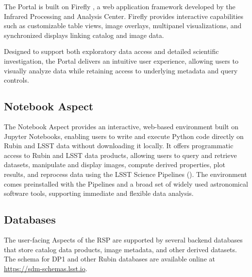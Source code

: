 The Portal is built on \gls{Firefly} \citep[][]{2019ASPC..521...32W}, a  web application framework developed by the Infrared Processing and Analysis Center.
\gls{Firefly} provides interactive capabilities such as customizable table views, image overlays, multipanel visualizations, and synchronized displays linking catalog and image data.

Designed to support both exploratory data access and detailed scientific investigation, the Portal delivers an intuitive user experience, allowing users to visually analyze data while retaining access to underlying metadata and query controls.

\subsection{Notebook Aspect}
\label{subsec:notebook}
The Notebook Aspect provides an interactive, web-based environment built on Jupyter Notebooks, enabling users to write and execute Python code directly on Rubin and \gls{LSST} data without downloading it locally.
It offers programmatic access to Rubin and LSST data products, allowing users to query and retrieve datasets, manipulate and display images, compute derived properties, plot results, and reprocess data using the LSST Science Pipelines ().
The environment comes preinstalled with the Pipelines and a broad set of widely used astronomical \gls{software} tools, supporting immediate and flexible data analysis.

\subsection{Databases}
\label{ssec:databases}
The user-facing Aspects of the \gls{RSP} are supported by several backend databases that store catalog data products, image metadata, and other derived datasets.
The \gls{schema} for \gls{DP1} and other Rubin databases are available online at \url{https://sdm-schemas.lsst.io}.

